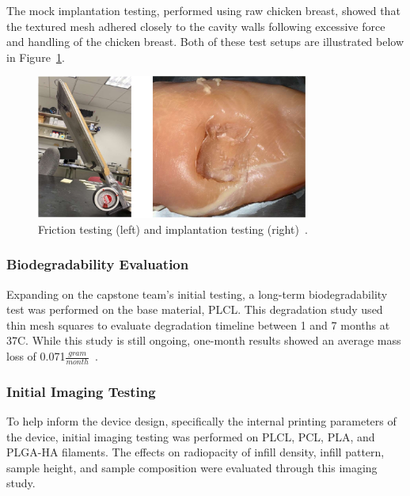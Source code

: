 The mock implantation testing, performed using raw chicken breast, showed that the textured mesh adhered closely to the cavity walls following excessive force and handling of the chicken breast. Both of these test setups are illustrated below in Figure~\ref{fig:introduction:frictionAndImplantationTesting}.

\begin{figure}[h!]
        \centering
        \includegraphics[width=0.8\textwidth]{../figs/introduction/friction_and_implantation_testing.png}
        \caption{Friction testing (left) and implantation testing (right)~\cite{RefWorks:RefID:371-bakhtardesign}.}
        \label{fig:introduction:frictionAndImplantationTesting}
\end{figure}


\subsubsection{Biodegradability Evaluation\label{sec:introduction:priorWork:otherTeamWork:biodegradabilityEval}}

Expanding on the capstone team's initial testing, a long-term biodegradability test was performed on the base material, PLCL. This degradation study used thin mesh squares to evaluate degradation timeline between 1 and 7 months at 37\textdegree C. While this study is still ongoing, one-month results showed an average mass loss of 0.071$\frac{gram}{month}$~\cite{RefWorks:RefID:371-bakhtardesign}.

\subsubsection{Initial Imaging Testing}

To help inform the device design, specifically the internal printing parameters of the device, initial imaging testing was performed on PLCL, PCL, PLA, and PLGA-HA filaments. The effects on radiopacity of infill density, infill pattern, sample height, and sample composition were evaluated through this imaging study.

